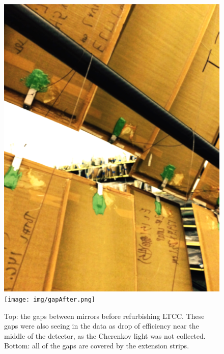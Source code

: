 \begin{figure}
\centering
	\includegraphics[width=0.98\columnwidth, height=0.7\columnwidth]{img/gapBefore.png}
	\texttt{[image: img/gapAfter.png]}
	\caption{Top: the gaps between mirrors before refurbishing LTCC. These gaps were also seeing in the data as
			 drop of efficiency near the middle of the detector, as the Cherenkov light was not collected.
             Bottom: all of the gaps are covered by the extension strips.}
	\label{fig:gapBeforeAndAfter}
\end{figure}




